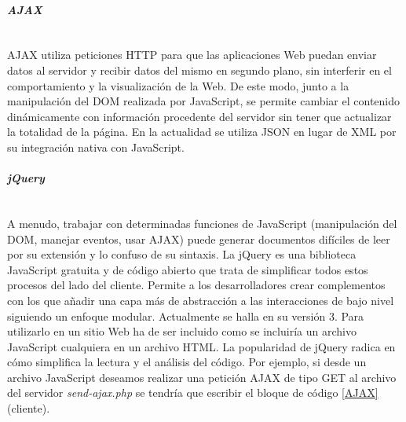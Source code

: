 \paragraph{\emph{AJAX}}~\\

AJAX utiliza peticiones HTTP para que las aplicaciones Web puedan enviar datos al servidor y recibir datos del mismo en segundo plano, sin interferir en el comportamiento y la visualización de la Web. De este modo, junto a la manipulación del DOM realizada por JavaScript, se permite cambiar el contenido dinámicamente con información procedente del servidor sin tener que actualizar la totalidad de la página. En la actualidad se utiliza JSON en lugar de XML por su integración nativa con JavaScript.

\paragraph{\emph{jQuery}}~\\

A menudo, trabajar con determinadas funciones de JavaScript (manipulación del DOM, manejar eventos, usar AJAX) puede generar documentos difíciles de leer por su extensión y lo confuso de su sintaxis. La jQuery es una biblioteca JavaScript gratuita y de código abierto que trata de simplificar todos estos procesos del lado del cliente. Permite a los desarrolladores crear complementos con los que añadir una capa más de abstracción a las interacciones de bajo nivel siguiendo un enfoque modular. Actualmente se halla en su versión 3. Para utilizarlo en un sitio Web ha de ser incluido como se incluiría un archivo JavaScript cualquiera en un archivo HTML. La popularidad de jQuery radica en cómo simplifica la lectura y el análisis del código. Por ejemplo, si desde un archivo JavaScript deseamos realizar una petición AJAX de tipo GET al archivo del servidor \emph{send-ajax.php} se tendría que escribir el bloque de código \ref{AJAX} (cliente).


